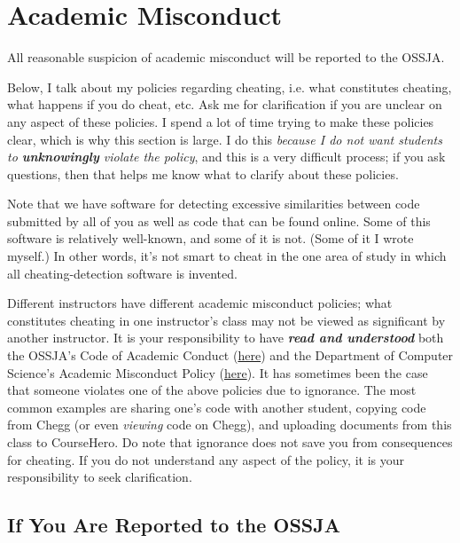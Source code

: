 \documentclass{article}
\begin{document}
\section{Academic Misconduct}

All reasonable suspicion of academic misconduct will be reported to the OSSJA.

Below, I talk about my policies regarding cheating, i.e. what constitutes cheating, what happens if you do cheat, etc. Ask me for clarification if you are unclear on any aspect of these policies. I spend a lot of time trying to make these policies clear, which is why this section is large. I do this \textit{because I do not want students to \textbf{unknowingly} violate the policy}, and this is a very difficult process; if you ask questions, then that helps me know what to clarify about these policies. %

Note that we have software for detecting excessive similarities between code submitted by all of you as well as code that can be found online. Some of this software is relatively well-known, and some of it is not. (Some of it I wrote myself.) In other words, it's not smart to cheat in the one area of study in which all cheating-detection software is invented.

Different instructors have different academic misconduct policies; what constitutes cheating in one instructor's class may not be viewed as significant by another instructor. It is your responsibility to have \textbf{\textit{read and understood}} both the OSSJA's Code of Academic Conduct (\href{https://supportjudicialaffairs.sf.ucdavis.edu/code-academic-conduct}{here}) and the Department of Computer Science's Academic Misconduct Policy (\href{https://cs.ucdavis.edu/undergraduate/current-majors/policies}{here}). It has sometimes been the case that someone violates one of the above policies due to ignorance. The most common examples are sharing one's code with another student, copying code from Chegg (or even \textit{viewing} code on Chegg), and uploading documents from this class to CourseHero. Do note that ignorance does not save you from consequences for cheating. If you do not understand any aspect of the policy, it is your responsibility to seek clarification.

\subsection{If You Are Reported to the OSSJA}
\end{document}
